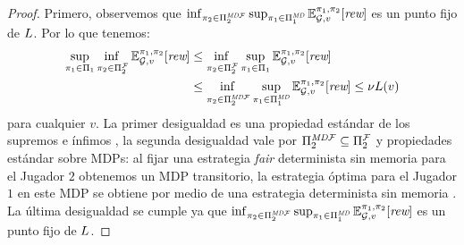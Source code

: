 \begin{proof}
  Primero, observemos que $\inf_{\pi_{2} \in \Pi^{\textit{MD}\mathcal{F}}_{2}}  \sup_{\pi_{1} \in \Pi^{\textit{MD}}_{1}} \mathbb{E}^{\pi_{1}, \pi_{2}}_{\mathcal{G},v}[\textit{rew}]$
  es un punto fijo de $L$.  Por lo que tenemos:
   \begin{align*}	
        \adjustlimits \sup_{\strat{1} \in \Strategies{1}}   \inf_{\strat{2} \in \FairStrats{2}}  \Expect{\strat{1}}{\strat{2}}_{\StochG,v}[\Rewards]
        & \leq \adjustlimits \inf_{\strat{2} \in \FairStrats{2}} \sup_{\strat{1} \in \Strategies{1}} \Expect{\strat{1}}{\strat{2}}_{\StochG,v}[\Rewards] \\
        &   \leq \adjustlimits  \inf_{\strat{2} \in \DetMemorylessFairStrats{2}}  \sup_{\strat{1} \in \DetMemorylessStrats{1}} \Expect{\strat{1}}{\strat{2}}_{\StochG,v}[\Rewards] 
         \leq   \nu \Bellman(v) 
  \end{align*} 
  para cualquier $v$. La primer desigualdad es una propiedad estándar de los supremos e ínfimos \cite{Kucera2011}, la segunda desigualdad vale por
  $\Pi^{\textit{MD}\mathcal{F}}_{2} \subseteq \Pi^{\mathcal{F}}_{2}$  y propiedades estándar sobre MDPs: al fijar una estrategia \textit{fair} determinista sin memoria para el Jugador $2$ obtenemos un MDP transitorio, la estrategia óptima para el Jugador $1$ en este MDP se obtiene por medio de una estrategia determinista sin memoria \cite{Kallenberg83}. La última desigualdad se cumple ya que  $\inf_{\pi_{2} \in \Pi^{\textit{MD}\mathcal{F}}_{2}}  \sup_{\pi_{1} \in \Pi^{\textit{MD}}_{1}} \mathbb{E}^{\pi_{1}, \pi_{2}}_{\mathcal{G},v}[\textit{rew}]$ es 
  un punto fijo de $L$. 
  

\end{proof}
